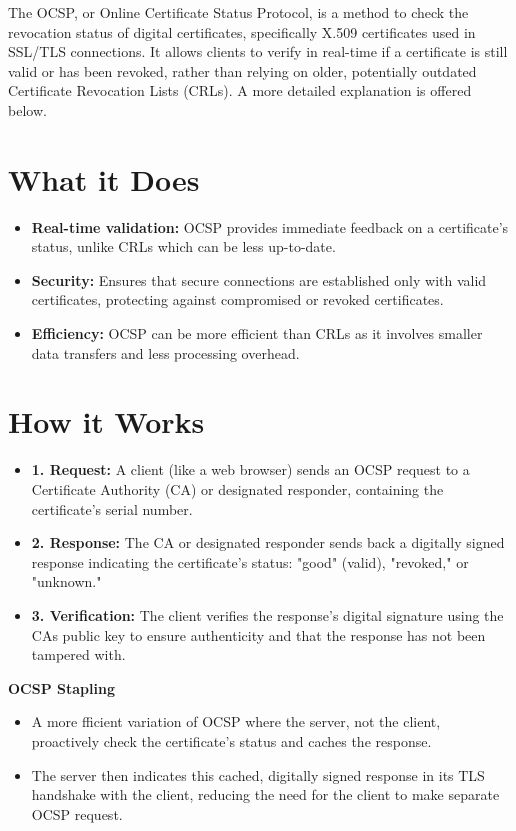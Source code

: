 \hrulefill

 The OCSP, or Online Certificate Status Protocol, is a method to check the revocation status of digital certificates, specifically X.509 certificates used in SSL/TLS connections. It allows clients to verify in real-time if a certificate is still valid or has been revoked, rather than relying on older, potentially outdated Certificate Revocation Lists (CRLs). A more detailed explanation is offered below.

\section{What it Does}
    \begin{itemize}
        \item \textbf{Real-time validation:} OCSP provides immediate feedback on a certificate's status, unlike CRLs which can be less up-to-date.
        \item \textbf{Security:} Ensures that secure connections are established only with valid certificates, protecting against compromised or revoked certificates.
        \item \textbf{Efficiency:} OCSP can be more efficient than CRLs as it involves smaller data transfers and less processing overhead.
    \end{itemize}
\section{How it Works}
\begin{itemize}
    \item \textbf{1. Request:} A client (like a web browser) sends an OCSP request to a Certificate Authority (CA) or designated responder, containing the certificate's serial number.
    \item \textbf{2. Response:} The CA or designated responder sends back a digitally signed response indicating the certificate's status: "good" (valid), "revoked," or "unknown."
    \item \textbf{3. Verification:} The client verifies the response's digital signature using the CAs public key to ensure authenticity and that the response has not been tampered with.

\end{itemize}
\textbf{OCSP Stapling}
\begin{itemize}
    \item A more fficient variation of OCSP where the server, not the client, proactively check the certificate's status and caches the response.
    \item The server then indicates this cached, digitally signed response in its TLS handshake with the client, reducing the need for the client to make separate OCSP request.
\end{itemize}

